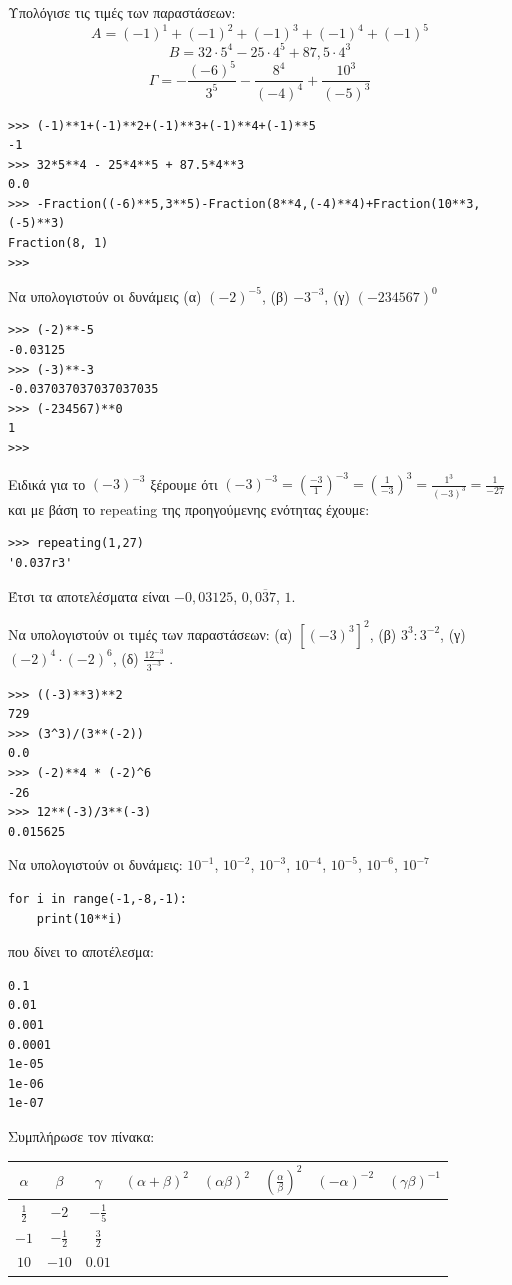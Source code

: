 \begin{exercise}
Υπολόγισε τις τιμές των παραστάσεων:
$$A = (-1)^1+(-1)^2+(-1)^3+(-1)^4+(-1)^5$$
$$B =32\cdot 5^4 - 25\cdot 4^5 + 87,5\cdot 4^3$$
$$\Gamma = -\frac{(-6)^5}{3^5}-\frac{8^4}{(-4)^4}+\frac{10^3}{(-5)^3}$$
\end{exercise}
\begin{lstlisting}
>>> (-1)**1+(-1)**2+(-1)**3+(-1)**4+(-1)**5
-1
>>> 32*5**4 - 25*4**5 + 87.5*4**3
0.0
>>> -Fraction((-6)**5,3**5)-Fraction(8**4,(-4)**4)+Fraction(10**3,(-5)**3)
Fraction(8, 1)
>>>
\end{lstlisting}
\begin{exercise}
Να υπολογιστούν οι δυνάμεις (α) $(-2)^{-5}$, (β) $-3^{-3}$, (γ) $(-234567)^0$
\end{exercise}
\begin{lstlisting}
>>> (-2)**-5
-0.03125
>>> (-3)**-3
-0.037037037037037035
>>> (-234567)**0
1
>>>
\end{lstlisting}
Ειδικά για το $(-3)^{-3}$ ξέρουμε ότι $(-3)^{-3}=\left(\frac{-3}{1}\right)^{-3}=\left(\frac{1}{-3}\right)^{3}=\frac{1^3}{(-3)^3}=\frac{1}{-27}$
και με βάση το repeating της προηγούμενης ενότητας έχουμε:
\begin{lstlisting}
>>> repeating(1,27)
'0.037r3'
\end{lstlisting}
Έτσι τα αποτελέσματα είναι $-0,03125$, $0,\overline{037}$, $1$.
\begin{exercise}
Να  υπολογιστούν  οι  τιμές των παραστάσεων:
(α)  $[(-3)^3]^2$,      (β) $3^3  : 3^{-2}$,      (γ) $(-2)^4 \cdot (-2)^6$,      (δ)  $\frac{12^{-3}}{3^{-3}}$ .
\end{exercise}
\begin{lstlisting}
>>> ((-3)**3)**2
729
>>> (3^3)/(3**(-2))
0.0
>>> (-2)**4 * (-2)^6
-26
>>> 12**(-3)/3**(-3)
0.015625
\end{lstlisting}
\begin{exercise}
Να  υπολογιστούν  οι  δυνάμεις: $10^{-1}$, $10^{-2}$, $10^{-3}$, $10^{-4}$, $10^{-5}$, $10^{-6}$, $10^{-7}$
\end{exercise}
\begin{lstlisting}
for i in range(-1,-8,-1):
    print(10**i)
\end{lstlisting}
που δίνει το αποτέλεσμα:
\begin{lstlisting}
0.1
0.01
0.001
0.0001
1e-05
1e-06
1e-07
\end{lstlisting}
\begin{exercise}
Συμπλήρωσε  τον πίνακα:
\begin{table}[ht]
\begin{tabular}{|c|c|c|c|c|c|c|c|}
\hline
$\alpha$&$\beta$&$\gamma$&$(\alpha+\beta)^2$&$(\alpha\beta)^2$&$\left(\frac{\alpha}{\beta}\right)^2$&$(-\alpha)^{-2}$&$(\gamma\beta)^{-1}$\\\hline
$\frac{1}{2}$&$-2$&$-\frac{1}{5}$&&&&&\\\hline
$-1$&$-\frac{1}{2}$&$\frac{3}{2}$&&&&&\\\hline
$10$&$-10$&$0.01$&&&&&\\\hline
\end{tabular}
\end{table}
\end{exercise}
